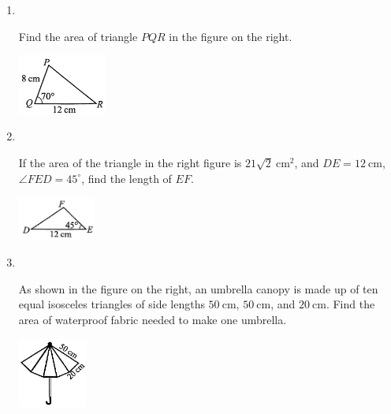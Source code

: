 \documentclass{report}
\begin{document}
    \begin{enumerate}
        \item \parbox[t]{0.9\textwidth}{
            ~
            \vspace{-1.1em}
            \begin{vwcol}[widths={0.7,0.3}, sep=8mm, rule=0pt]
                Find the area of triangle $PQR$ in the figure on the right.
    
                \includegraphics[width=0.23\textwidth]{assets/10-45.jpg}
            \end{vwcol}
        }
        
        \vspace{4em}
        \item \parbox[t]{0.9\textwidth}{
            ~
            \vspace{-1.1em}
            \begin{vwcol}[widths={0.7,0.3}, sep=8mm, rule=0pt]
                If the area of the triangle in the right figure is $21 \sqrt{2} \mathrm{~cm}^{2}$, and $DE = 12 \mathrm{~cm}$, $\angle FED = 45^\circ$, find the length of $EF$.
    
                \includegraphics[width=0.2\textwidth]{assets/10-46.jpg}
            \end{vwcol}
        }
        
        \vspace{3em}
        \item \parbox[t]{0.9\textwidth}{
            ~
            \vspace{-1.1em}
            \begin{vwcol}[widths={0.7,0.3}, sep=8mm, rule=0pt]
                As shown in the figure on the right, an umbrella canopy is made up of ten equal isosceles triangles of side lengths $50 \mathrm{~cm}$, $50 \mathrm{~cm}$, and $20 \mathrm{~cm}$. Find the area of waterproof fabric needed to make one umbrella.
    
                \includegraphics[width=0.18\textwidth]{assets/10-47.jpg}
            \end{vwcol}
        }
        

\end{enumerate}
\end{document}
